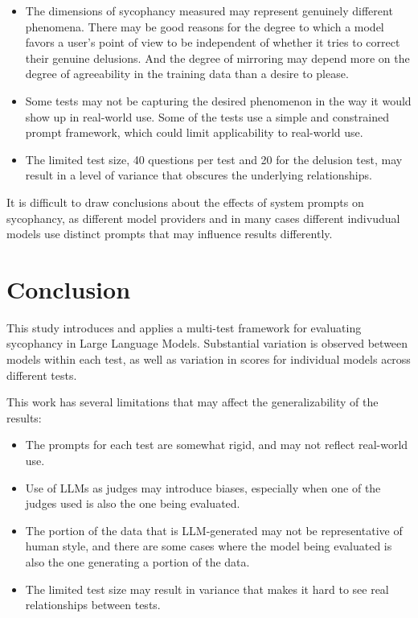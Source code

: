 \documentclass{article}
\begin{document}
\begin{itemize}
    \item The dimensions of sycophancy measured may represent genuinely different phenomena. There may be good reasons for the degree to which a model favors a user's point of view to be independent of whether it tries to correct their genuine delusions. And the degree of mirroring may depend more on the degree of agreeability in the training data than a desire to please.
    \item Some tests may not be capturing the desired phenomenon in the way it would show up in real-world use. Some of the tests use a simple and constrained prompt framework, which could limit applicability to real-world use.
    \item The limited test size, 40 questions per test and 20 for the delusion test, may result in a level of variance that obscures the underlying relationships.
\end{itemize}

It is difficult to draw conclusions about the effects of system prompts on sycophancy, as different model providers and in many cases different indivudual models use distinct prompts that may influence results differently.

\section{Conclusion}
This study introduces and applies a multi-test framework for evaluating sycophancy in Large Language Models. Substantial variation is observed between models within each test, as well as variation in scores for individual models across different tests.

This work has several limitations that may affect the generalizability of the results: 

\begin{itemize}
    \item The prompts for each test are somewhat rigid, and may not reflect real-world use.
    \item Use of LLMs as judges may introduce biases, especially when one of the judges used is also the one being evaluated.
    \item The portion of the data that is LLM-generated may not be representative of human style, and there are some cases where the model being evaluated is also the one generating a portion of the data.
    \item The limited test size may result in variance that makes it hard to see real relationships between tests.
\end{itemize}
\end{document}
